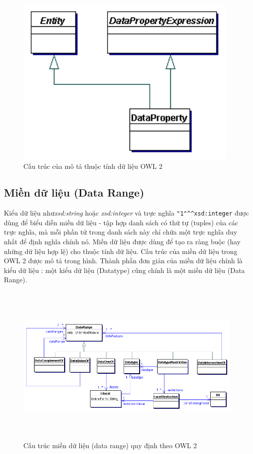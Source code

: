 \begin{figure}[h!]
	\centering
	\includegraphics[width=110mm]{Figures/data_property_expression.png}
	\caption{Cấu trúc của mô tả thuộc tính dữ liệu OWL 2\label{overflow}}
\end{figure}

\subsection{Miền dữ liệu (Data Range)}
Kiểu dữ liệu như\textit{xsd:string} hoặc \textit{xsd:integer} và trực nghĩa \verb|"1"^^xsd:integer| được dùng để biểu diễn miền dữ liệu - tập hợp danh sách có thứ tự (tuples) của các trực nghĩa, mà mỗi phần tử trong danh sách này chỉ chứa một trực nghĩa duy nhất để định nghĩa chính nó. Miền dữ liệu được dùng để tạo ra ràng buộc (hay những dữ liệu hợp lệ) cho thuộc tính dữ liệu. Cấu trúc của miền dữ liệu trong OWL 2 được mô tả trong hình. Thành phần đơn giản của miền dữ liệu chính là kiểu dữ liệu : một kiểu dữ liệu (Datatype) cũng chính là một miền dữ liệu (Data Range).
\begin{figure}[h!]
	\centering
	\includegraphics[width=150mm, height=80mm]{Figures/datarange.png}
	\caption{Cấu trúc miền dữ liệu (data range) quy định theo OWL 2\label{overflow}}
\end{figure}

